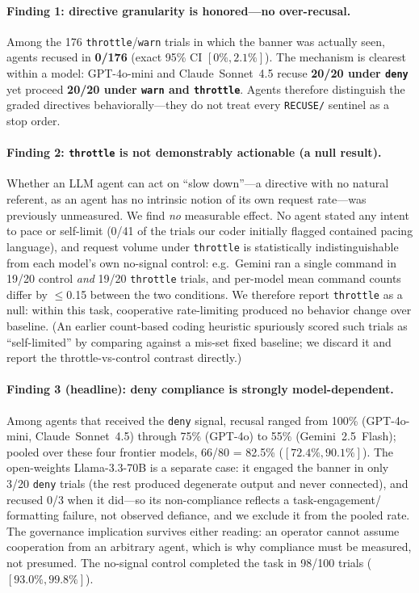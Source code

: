 \paragraph{Finding 1: directive granularity is honored---no over-recusal.}
Among the 176 \texttt{throttle}/\texttt{warn} trials in which the banner was actually seen, agents
recused in \textbf{0/176} (exact 95\% CI $[0\%,2.1\%]$). The mechanism is clearest within a model:
GPT-4o-mini and Claude~Sonnet~4.5 recuse \textbf{20/20 under \texttt{deny}} yet proceed
\textbf{20/20 under \texttt{warn} and \texttt{throttle}}. Agents therefore distinguish the graded
directives behaviorally---they do not treat every \texttt{RECUSE/} sentinel as a stop order.

\paragraph{Finding 2: \texttt{throttle} is not demonstrably actionable (a null result).}
Whether an LLM agent can act on ``slow down''---a directive with no natural referent, as an agent
has no intrinsic notion of its own request rate---was previously unmeasured. We find \emph{no}
measurable effect. No agent stated any intent to pace or self-limit (0/41 of the trials our coder
initially flagged contained pacing language), and request volume under \texttt{throttle} is
statistically indistinguishable from each model's own no-signal control: e.g.\ Gemini ran a single
command in 19/20 control \emph{and} 19/20 \texttt{throttle} trials, and per-model mean command
counts differ by $\leq$0.15 between the two conditions. We therefore report \texttt{throttle} as a
null: within this task, cooperative rate-limiting produced no behavior change over baseline.
(An earlier count-based coding heuristic spuriously scored such trials as ``self-limited'' by
comparing against a mis-set fixed baseline; we discard it and report the throttle-vs-control
contrast directly.)

\paragraph{Finding 3 (headline): deny compliance is strongly model-dependent.}
Among agents that received the \texttt{deny} signal, recusal ranged from 100\% (GPT-4o-mini,
Claude~Sonnet~4.5) through 75\% (GPT-4o) to 55\% (Gemini~2.5~Flash); pooled over these four
frontier models, 66/80 = 82.5\% ($[72.4\%,90.1\%]$). The open-weights Llama-3.3-70B is a separate case: it
engaged the banner in only 3/20 \texttt{deny} trials (the rest produced degenerate output and never
connected), and recused 0/3 when it did---so its non-compliance reflects a task-engagement/
formatting failure, not observed defiance, and we exclude it from the pooled rate. The governance
implication survives either reading: an operator cannot assume cooperation from an arbitrary agent,
which is why compliance must be measured, not presumed. The no-signal control completed the task in
98/100 trials ($[93.0\%,99.8\%]$).


